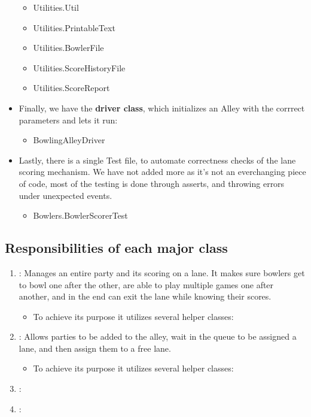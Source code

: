 \begin{itemize}
          \begin{itemize}
              \item Utilities.Util
              \item Utilities.PrintableText
              \item Utilities.BowlerFile
              \item Utilities.ScoreHistoryFile
              \item Utilities.ScoreReport
          \end{itemize}
    \item Finally, we have the \textbf{driver class}, which initializes an Alley with the corrrect parameters and lets it run:
          \begin{itemize}
              \item BowlingAlleyDriver
          \end{itemize}
    \item Lastly, there is a single Test file, to automate correctness checks of the lane scoring mechanism. We have not added more as it's not an everchanging piece of code, most of the testing is done through asserts, and throwing errors under unexpected events.
          \begin{itemize}
              \item Bowlers.BowlerScorerTest
          \end{itemize}
\end{itemize}

\subsection{Responsibilities of each major class}

\begin{enumerate}
    \item {}: Manages an entire party and its scoring on a lane. It makes sure bowlers get to bowl one after the other, are able to play multiple games one after another, and in the end can exit the lane while knowing their scores.
    \begin{itemize}
        \item To achieve its purpose it utilizes several helper classes:
    \end{itemize}
    \item {}: Allows parties to be added to the alley, wait in the queue to be assigned a lane, and then assign them to a free lane.
    \begin{itemize}
        \item To achieve its purpose it utilizes several helper classes:
    \end{itemize}
    \item {}:
    \item {}:
\end{enumerate}

